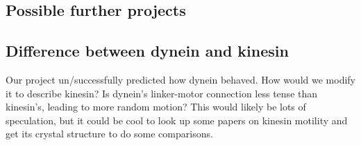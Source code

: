 \documentclass[10pt]{article} %
\begin{document}
\subsection{Possible further projects}
\subsection{Difference between dynein and kinesin}
Our project un/successfully predicted how dynein behaved. How would we modify it to describe kinesin?
Is dynein's linker-motor connection less tense than kinesin's, leading to more random motion? This
would likely be lots of speculation, but it could be cool to look up some papers on kinesin motility
and get its crystal structure to do some comparisons.


\end{document}
